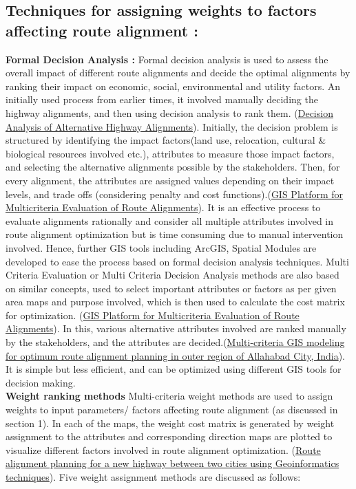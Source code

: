\subsection{Techniques for assigning weights to factors affecting route alignment : }
\textbf{Formal Decision Analysis : }
Formal decision analysis is used to assess the overall impact of different route alignments and decide the optimal alignments by ranking their impact on economic, social, environmental and utility factors. An initially used process from earlier times, it involved manually deciding the highway alignments, and then using decision analysis to rank them. (\href{https://ascelibrary.org/doi/10.1061/%28ASCE%290733-947X%281993%29119%3A3%28317%29 }{Decision Analysis of Alternative Highway Alignments}). Initially, the decision problem is structured by identifying the impact factors(land use, relocation, cultural & biological resources involved etc.), attributes to measure those impact factors, and selecting the alternative alignments possible by the stakeholders. Then, for every alignment, the attributes are assigned values depending on their impact  levels, and trade offs (considering penalty and cost functions).(\href{https://ascelibrary.org/doi/abs/10.1061/(ASCE)0733-947X(1999)125%3A2(144)}{GIS Platform for Multicriteria Evaluation of Route Alignments}). It is an effective process to evaluate alignments rationally and consider all multiple attributes involved in route alignment optimization but is time consuming due to manual intervention involved. Hence, further GIS tools including ArcGIS, Spatial Modules are developed to ease the process based on formal decision analysis techniques. Multi Criteria Evaluation or Multi Criteria Decision Analysis methods are also based on similar concepts, used to select important attributes or factors as per given area maps and purpose involved, which is then used to calculate the cost matrix for optimization. (\href{https://ascelibrary.org/doi/abs/10.1061/(ASCE)0733-947X(1999)125%3A2(144)}{GIS Platform for Multicriteria Evaluation of Route Alignments}). In this, various alternative attributes involved are ranked manually by the stakeholders, and the attributes are decided.(\href{https://link.springer.com/article/10.1007/s12517-017-3076-z
}{Multi-criteria GIS modeling for optimum route alignment planning in outer region of Allahabad City, India}). It is simple but less efficient, and can be optimized using different GIS tools for decision making.\\
\textbf{Weight ranking methods}
Multi-criteria weight methods are used to assign weights to input parameters/ factors affecting route alignment (as discussed in section 1). In each of the maps, the weight cost matrix is generated by weight assignment to the attributes and corresponding direction maps are plotted to visualize different factors involved in route alignment optimization. (\href{https://www.sciencedirect.com/science/article/pii/S1110982321000399}{Route alignment planning for a new highway between two cities using Geoinformatics techniques}). Five weight assignment methods are discussed as follows:
